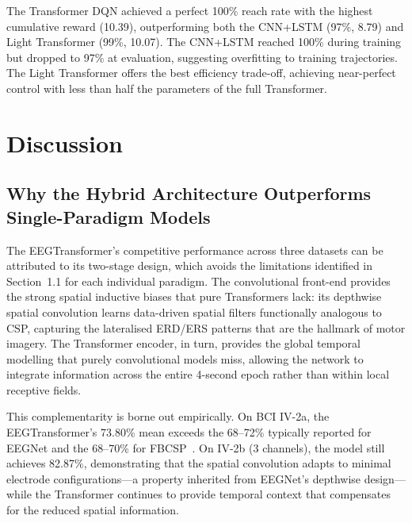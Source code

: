 \documentclass[12pt, a4paper]{article}
\begin{document}
The Transformer DQN achieved a perfect 100\% reach rate with the highest cumulative reward (10.39), outperforming both the CNN+LSTM (97\%, 8.79) and Light Transformer (99\%, 10.07). The CNN+LSTM reached 100\% during training but dropped to 97\% at evaluation, suggesting overfitting to training trajectories. The Light Transformer offers the best efficiency trade-off, achieving near-perfect control with less than half the parameters of the full Transformer.

\section{Discussion}

\subsection{Why the Hybrid Architecture Outperforms Single-Paradigm Models}

The EEGTransformer's competitive performance across three datasets can be attributed to its two-stage design, which avoids the limitations identified in Section~1.1 for each individual paradigm. The convolutional front-end provides the strong spatial inductive biases that pure Transformers lack: its depthwise spatial convolution learns data-driven spatial filters functionally analogous to CSP, capturing the lateralised ERD/ERS patterns that are the hallmark of motor imagery. The Transformer encoder, in turn, provides the global temporal modelling that purely convolutional models miss, allowing the network to integrate information across the entire 4-second epoch rather than within local receptive fields.

This complementarity is borne out empirically. On BCI IV-2a, the EEGTransformer's 73.80\% mean exceeds the 68--72\% typically reported for EEGNet and the 68--70\% for FBCSP~\cite{hameed2025enhancing}. On IV-2b (3 channels), the model still achieves 82.87\%, demonstrating that the spatial convolution adapts to minimal electrode configurations---a property inherited from EEGNet's depthwise design---while the Transformer continues to provide temporal context that compensates for the reduced spatial information.
\end{document}
